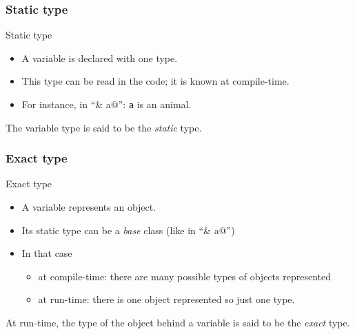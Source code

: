 \documentclass{beamer}
\newcommand{\code}[1]{{\scriptsize{\texttt{#1}}}\xspace}
\begin{document}
\begin{frame}
  \frametitle{Static type}

  \begin{block}{Static type}
    \begin{itemize}
      \item A variable is declared with one type.
      \item This type can be read in the code; it is known at compile-time.
      \item For instance, in ``\lstinline@animal& a@'': \code{a} is an animal.
    \end{itemize}
    
    The variable type is said to be the \emph{static} type.
  \end{block}
  
\end{frame}



\begin{frame}
  \frametitle{Exact type}
  
  \begin{block}{Exact type}
    \begin{itemize}
    \item A variable represents an object.
    \item Its static type can be a \textit{base} class (like in ``\lstinline@animal& a@'')
    \item In that case
      \begin{itemize}
      \item at compile-time: there are many possible types of objects represented
      \item at run-time: there is one object represented so just one type.
      \end{itemize}
    \end{itemize}

    At run-time, the type of the object behind a variable is said to
    be the \emph{exact} type.
  \end{block}
  
\end{frame}
\end{document}
